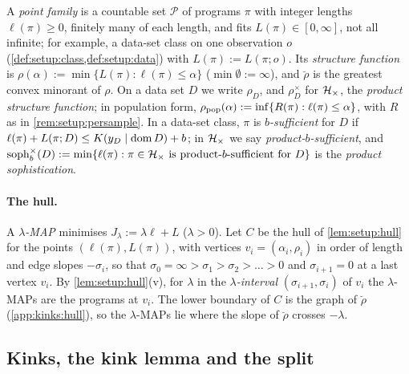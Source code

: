 \begin{definition}\label{def:algstat:product}
A \emph{point family} is a countable set $\mathcal P$ of programs $\pi$ with integer lengths $\ell(\pi)\ge0$, finitely many of each length, and fits $L(\pi)\in[0,\infty]$, not all infinite; for example, a data-set class on one observation $o$ (\cref{def:setup:class,def:setup:data}) with $L(\pi):=L(\pi;o)$. Its \emph{structure function} is $\rho(\alpha):=\min\{L(\pi):\ell(\pi)\le\alpha\}$ ($\min\emptyset:=\infty$), and $\breve\rho$ is the greatest convex minorant of $\rho$. On a data set $D$ we write $\rho_D$, and $\rho^\times_D$ for $\mathcal{H}_{\times}$, the \emph{product structure function}; in population form, $\rho_{\rm pop}(\alpha):=\inf\{R(\pi):\ell(\pi)\le\alpha\}$, with $R$ as in \cref{rem:setup:persample}. In a data-set class, $\pi$ is \emph{$b$-sufficient} for $D$ if $\ell(\pi)+L(\pi;D)\le K(y_D\mid\operatorname{dom} D)+b$; in $\mathcal{H}_{\times}$ we say \emph{product-$b$-sufficient}, and $\operatorname{soph}^{\times}_b(D):=\min\{\ell(\pi):\pi\in\mathcal{H}_{\times}\text{ is product-$b$-sufficient for }D\}$ is the \emph{product sophistication}.
\end{definition}

\paragraph{The hull.} A \emph{$\lambda$-MAP} minimises $J_\lambda:=\lambda\ell+L$ ($\lambda>0$). Let $C$ be the hull of \cref{lem:setup:hull} for the points $(\ell(\pi),L(\pi))$, with vertices $v_i=(\alpha_i,\rho_i)$ in order of length and edge slopes $-\sigma_i$, so that $\sigma_0=\infty>\sigma_1>\sigma_2>\dots>0$ and $\sigma_{i+1}=0$ at a last vertex $v_i$. By \cref{lem:setup:hull}(v), for $\lambda$ in the \emph{$\lambda$-interval} $(\sigma_{i+1},\sigma_i)$ of $v_i$ the $\lambda$-MAPs are the programs at $v_i$. The lower boundary of $C$ is the graph of $\breve\rho$ (\cref{app:kinks:hull}), so the $\lambda$-MAPs lie where the slope of $\breve\rho$ crosses $-\lambda$.

\subsection{Kinks, the kink lemma and the split}\label{sec:kinks:lemma}

